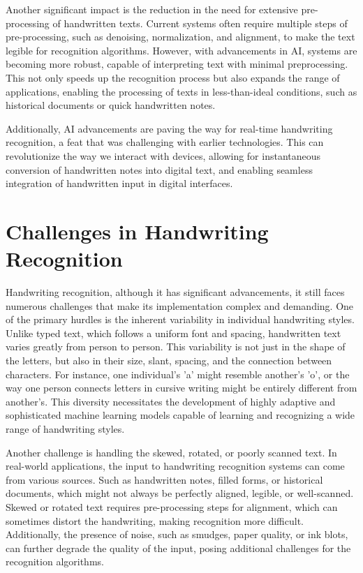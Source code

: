 \documentclass[12pt]{article}
\begin{document}
Another significant impact is the reduction in the need for extensive pre-processing of handwritten texts. Current systems often require multiple steps of pre-processing, such as denoising, normalization, and alignment, to make the text legible for recognition algorithms. However, with advancements in AI, systems are becoming more robust, capable of interpreting text with minimal preprocessing. This not only speeds up the recognition process but also expands the range of applications, enabling the processing of texts in less-than-ideal conditions, such as historical documents or quick handwritten notes.

Additionally, AI advancements are paving the way for real-time handwriting recognition, a feat that was challenging with earlier technologies. This can revolutionize the way we interact with devices, allowing for instantaneous conversion of handwritten notes into digital text, and enabling seamless integration of handwritten input in digital interfaces.

\section* {Challenges in Handwriting Recognition}
Handwriting recognition, although it has significant advancements, it still faces numerous challenges that make its implementation complex and demanding. One of the primary hurdles is the inherent variability in individual handwriting styles. Unlike typed text, which follows a uniform font and spacing, handwritten text varies greatly from person to person. \cite{Improvements}This variability is not just in the shape of the letters, but also in their size, slant, spacing, and the connection between characters. For instance, one individual's 'a' might resemble another's 'o', or the way one person connects letters in cursive writing might be entirely different from another's. This diversity necessitates the development of highly adaptive and sophisticated machine learning models capable of learning and recognizing a wide range of handwriting styles.

Another challenge is handling the skewed, rotated, or poorly scanned text. In real-world applications, the input to handwriting recognition systems can come from various sources. Such as handwritten notes, filled forms, or historical documents, which might not always be perfectly aligned, legible, or well-scanned. Skewed or rotated text requires pre-processing steps for alignment, which can sometimes distort the handwriting, making recognition more difficult. Additionally, the presence of noise, such as smudges, paper quality, or ink blots, can further degrade the quality of the input, posing additional challenges for the recognition algorithms.
\end{document}
